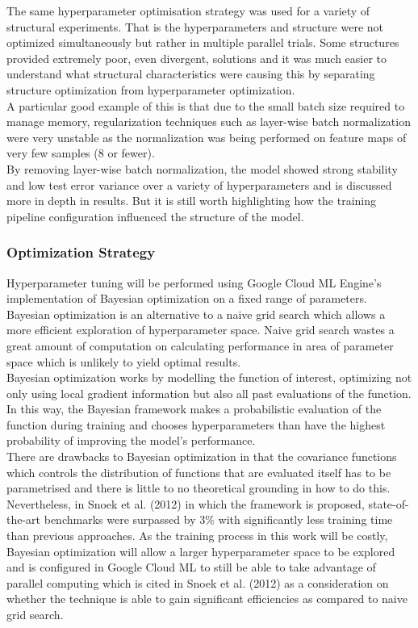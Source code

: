 \documentclass{article}
\begin{document}
{The same hyperparameter optimisation strategy was used for a variety of structural experiments. That is the hyperparameters and structure were not optimized simultaneously but rather in multiple parallel trials. Some structures provided extremely poor, even divergent, solutions and it was much easier to understand what structural characteristics were causing this by separating structure optimization from hyperparameter optimization.\\

A particular good example of this is that due to the small batch size required to manage memory, regularization techniques such as layer-wise batch normalization were very unstable as the normalization was being performed on feature maps of very few samples (8 or fewer). \\

By removing layer-wise batch normalization, the model showed strong stability and low test error variance over a variety of hyperparameters and is discussed more in depth in results.  But it is still worth highlighting how the training pipeline configuration influenced the structure of the model. \\


\subsubsection{Optimization Strategy}

Hyperparameter tuning will be performed using Google Cloud ML Engine's implementation of Bayesian optimization on a fixed range of parameters. Bayesian optimization is an alternative to a naive grid search which allows a more efficient exploration of hyperparameter space. Naive grid search wastes a great amount of computation on calculating performance in area of parameter space which is unlikely to yield optimal results.\\

Bayesian optimization works by modelling the function of interest, optimizing not only using local gradient information but also all past evaluations of the function. In this way, the Bayesian framework makes a probabilistic evaluation of the function during training and chooses hyperparameters than have the highest probability of improving the model's performance.\\

 There are drawbacks to Bayesian optimization in that the covariance functions which controls the distribution of functions that are evaluated itself has to be parametrised and there is little to no theoretical grounding in how to do this. Nevertheless, in Snoek et al. (2012) in which the framework is proposed, state-of-the-art benchmarks were surpassed by 3\% with significantly less training time than previous approaches. As the training process in this work will be costly, Bayesian optimization will allow a larger hyperparameter space to be explored and is configured in Google Cloud ML to still be able to take advantage of parallel computing which is cited in Snoek et al. (2012) as a consideration on whether the technique is able to gain significant efficiencies as compared to naive grid search. \\
 
}
\end{document}
